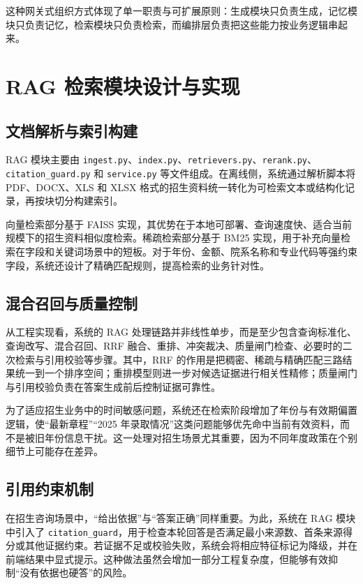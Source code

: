 \documentclass[UTF8,zihao=-4,oneside,fontset=windows]{ctexbook}
\numberwithin{equation}{chapter}
\begin{document}
这种网关式组织方式体现了单一职责与可扩展原则：生成模块只负责生成，记忆模块只负责记忆，检索模块只负责检索，而编排层负责把这些能力按业务逻辑串起来。

\section{RAG 检索模块设计与实现}
\subsection{文档解析与索引构建}
RAG 模块主要由 \texttt{ingest.py}、\texttt{index.py}、\texttt{retrievers.py}、\texttt{rerank.py}、\texttt{citation\_guard.py} 和 \texttt{service.py} 等文件组成\cite{projectanalysis}。在离线侧，系统通过解析脚本将 PDF、DOCX、XLS 和 XLSX 格式的招生资料统一转化为可检索文本或结构化记录，再按块切分构建索引。

向量检索部分基于 FAISS 实现\cite{johnson2017faiss}，其优势在于本地可部署、查询速度快、适合当前规模下的招生资料相似度检索。稀疏检索部分基于 BM25 实现\cite{robertson2009bm25}，用于补充向量检索在字段和关键词场景中的短板。对于年份、金额、院系名称和专业代码等强约束字段，系统还设计了精确匹配规则，提高检索的业务针对性。

\subsection{混合召回与质量控制}
从工程实现看，系统的 RAG 处理链路并非线性单步，而是至少包含查询标准化、查询改写、混合召回、RRF 融合、重排、冲突裁决、质量闸门检查、必要时的二次检索与引用校验等步骤\cite{projectanalysis}。其中，RRF 的作用是把稠密、稀疏与精确匹配三路结果统一到一个排序空间；重排模型则进一步对候选证据进行相关性精修；质量闸门与引用校验负责在答案生成前后控制证据可靠性。

为了适应招生业务中的时间敏感问题，系统还在检索阶段增加了年份与有效期偏置逻辑，使“最新章程”“2025 年录取情况”这类问题能够优先命中当前有效资料，而不是被旧年份信息干扰。这一处理对招生场景尤其重要，因为不同年度政策在个别细节上可能存在差异。

\subsection{引用约束机制}
在招生咨询场景中，“给出依据”与“答案正确”同样重要。为此，系统在 RAG 模块中引入了 \texttt{citation\_guard}，用于检查本轮回答是否满足最小来源数、首条来源得分或其他证据约束\cite{projectreadme}。若证据不足或校验失败，系统会将相应特征标记为降级，并在前端结果中显式提示。这种做法虽然会增加一部分工程复杂度，但能够有效抑制“没有依据也硬答”的风险。
\end{document}
